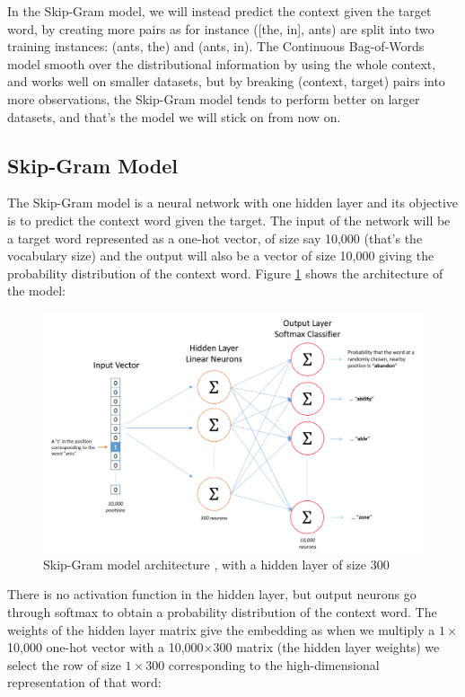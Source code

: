 In the Skip-Gram model, we will instead predict the context given the target word, by creating more pairs as for instance ([the, in], ants) are split into two training instances: (ants, the) and (ants, in). The Continuous Bag-of-Words model smooth over the distributional information by using the whole context, and works well on smaller datasets, but by breaking (context, target) pairs into more observations, the Skip-Gram model tends to perform better on larger datasets, and that's the model we will stick on from now on.

\subsection{Skip-Gram Model}
The Skip-Gram model is a neural network with one hidden layer and its objective is to predict the context word given the target. The input of the network will be a target word represented as a one-hot vector, of size say 10,000 (that's the vocabulary size) and the output will also be a vector of size 10,000 giving the probability distribution of the context word. Figure \ref{fig:skip-gram} shows the architecture of the model:

\begin{figure}[H]
    \centering
    \includegraphics[width=\textwidth]{Images/word2vec-architecture.png}
    \caption{Skip-Gram model architecture \cite{word2vec-architecture}, with a hidden layer of size 300}
    \label{fig:skip-gram}
\end{figure}

There is no activation function in the hidden layer, but output neurons go through softmax to obtain a probability distribution of the context word. The weights of the hidden layer matrix give the embedding as when we multiply a $1\times$10,000 one-hot vector with a 10,000$\times300$ matrix (the hidden layer weights) we select the row of size $1\times300$ corresponding to the high-dimensional representation of that word:

